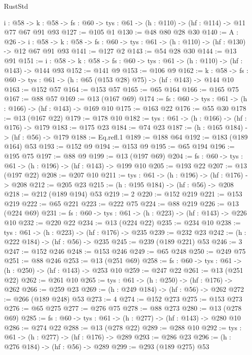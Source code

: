 \begin{lexlean}{RustStd}
\begin{coremodule}
{\begin{coremodule}
{{{{{{{{{{{{{{{{{{{{{{  {i : @58} ->
  {k : @58} -> {fs : @60} -> {tys : @61} -> (h : @110) -> (hf : @114) -> @11 @77 @67 @91 @93
@127 := @105 @1
@130 := @48 @80 @28 @30
@140 := {A : @26} ->
  {i : @58} ->
  {k : @58} -> {fs : @60} -> {tys : @61} -> (h : @110) -> (hf : @130) -> @12 @67 @91 @93
@141 := @127 @2
@143 := @54 @28 @30
@144 := @13 @91
@151 := {i : @58} -> {k : @58} -> {fs : @60} -> {tys : @61} -> (h : @110) -> (hf : @143) -> @144 @93
@152 := @141 @9
@153 := @106 @9
@162 := {k : @58} ->
  {fs : @60} -> {tys : @61} -> (h : @65 (@153 @28) @75) -> (hf : @143) -> @144 @10
@163 := @152 @57
@164 := @153 @57
@165 := @65 @164
@166 := @165 @75
@167 := @88 @57
@169 := @13 (@167 @69)
@174 := {fs : @60} -> {tys : @61} -> (h : @166) -> (hf : @143) -> @169 @10
@175 := @163 @22
@176 := @55 @30
@178 := @13 (@167 @22)
@179 := @178 @10
@182 := {tys : @61} -> (h : @166) -> (hf : @176) -> @179
@183 := @175 @23
@184 := @74 @23
@187 := (h : @165 @184) -> (hf : @56) -> @179
@188 := Eq.refl.{1}
@189 := @188 @64
@192 := @183 (@189 @164) @53
@193 := @152 @9
@194 := @153 @9
@195 := @65 @194
@196 := @195 @75
@197 := @88 @9
@199 := @13 (@197 @69)
@204 := {fs : @60} -> {tys : @61} -> (h : @196) -> (hf : @143) -> @199 @10
@205 := @193 @22
@207 := @13 (@197 @22)
@208 := @207 @10
@211 := {tys : @61} -> (h : @196) -> (hf : @176) -> @208
@212 := @205 @23
@215 := (h : @195 @184) -> (hf : @56) -> @208
@218 := @212 (@189 @194) @53
@219 := 2
@220 := @152 @219
@221 := @153 @219
@222 := @65 @221
@223 := @222 @75
@224 := @88 @219
@226 := @13 (@224 @69)
@231 := {fs : @60} -> {tys : @61} -> (h : @223) -> (hf : @143) -> @226 @10
@232 := @220 @22
@234 := @13 (@224 @22)
@235 := @234 @10
@238 := {tys : @61} -> (h : @223) -> (hf : @176) -> @235
@239 := @232 @23
@242 := (h : @222 @184) -> (hf : @56) -> @235
@245 := @239 (@189 @221) @53
@246 := 3
@247 := @152 @246
@248 := @153 @246
@249 := @65 @248
@250 := @249 @75
@251 := @88 @246
@253 := @13 (@251 @69)
@258 := {fs : @60} -> {tys : @61} -> (h : @250) -> (hf : @143) -> @253 @10
@259 := @247 @22
@261 := @13 (@251 @22)
@262 := @261 @10
@265 := {tys : @61} -> (h : @250) -> (hf : @176) -> @262
@266 := @259 @23
@269 := (h : @249 @184) -> (hf : @56) -> @262
@272 := @266 (@189 @248) @53
@273 := 4
@274 := @152 @273
@275 := @153 @273
@276 := @65 @275
@277 := @276 @75
@278 := @88 @273
@280 := @13 (@278 @69)
@285 := {fs : @60} -> {tys : @61} -> (h : @277) -> (hf : @143) -> @280 @10
@286 := @274 @22
@288 := @13 (@278 @22)
@289 := @288 @10
@292 := {tys : @61} -> (h : @277) -> (hf : @176) -> @289
@293 := @286 @23
@296 := (h : @276 @184) -> (hf : @56) -> @289
@299 := @293 (@189 @275) @53
}}}}}}}}}}}}}}}}}}}}}}
\end{coremodule}}
\end{coremodule}
\end{lexlean}
